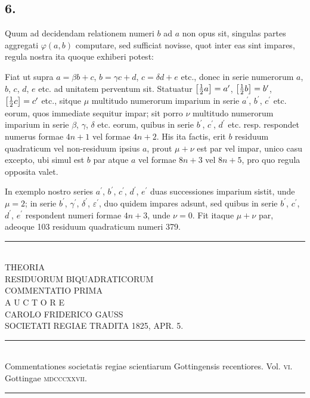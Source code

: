 \documentclass[twoside,12pt]{memoir}
\let\oldfrac\frac
\def\frac#1#2{\mathchoice{\tfrac{#1}{#2}}{\oldfrac{#1}{#2}}{\genfrac{}{}{}{2}{#1}{#2\mathstrut}}{\genfrac{}{}{}{3}{#1}{#2\mathstrut}}}
\begin{document}
\subsection*{6.}
 
Quum ad decidendam relationem numeri \(b\) ad \(a\) non opus sit, singulas partes aggregati \(\varphi(a, b)\) computare, sed sufficiat novisse, quot inter eas sint impares, regula nostra ita quoque exhiberi potest:
 
Fiat ut supra \(a=\beta b+c\), \(b=\gamma c+d\), \(c=\delta d+e\) etc., donec in serie numerorum \(a\), \(b\), \(c\), \(d\), \(e\) etc. ad unitatem perventum sit. Statuatur \(\left[\frac{1}{2} a\right]=a^{\prime}\), \(\left[\frac{1}{2} b\right]=b^{\prime}\), \(\left[\frac{1}{2} c\right]=c^{\prime}\) etc., sitque \(\mu\) multitudo numerorum imparium in serie \(a^{\prime}\), \(b^{\prime}\), \(c^{\prime}\) etc. eorum, quos immediate sequitur impar; sit porro \(\nu\) multitudo numerorum imparium in serie \(\beta\), \(\gamma\), \(\delta\) etc. eorum, quibus in serie \(b^{\prime}\), \(c^{\prime}\), \(d^{\prime}\) etc. resp. respondet numerus formae \(4 n+1\) vel formae \(4 n+2\). His ita factis, erit \(b\) residuum quadraticum vel non-residuum ipsius \(a\), prout \(\mu+\nu\) est par vel impar, unico casu excepto, ubi simul est \(b\) par atque \(a\) vel formae \(8 n+3\) vel \(8 n+5\), pro quo regula opposita valet.
 
In exemplo nostro series \(a^{\prime}\), \(b^{\prime}\), \(c^{\prime}\), \(d^{\prime}\), \(e^{\prime}\) duas successiones imparium sistit, unde \(\mu=2\); in serie \(b^{\prime}\), \(\gamma^{\prime}\), \(\delta^{\prime}\), \(\varepsilon^{\prime}\), duo quidem impares adsunt, sed quibus in serie \(b^{\prime}\), \(c^{\prime}\), \(d^{\prime}\), \(e^{\prime}\) respondent numeri formae \(4 n+3\), unde \(\nu=0\). Fit itaque \(\mu+\nu\) par, adeoque 103 residuum quadraticum numeri 379.\\[1.5\baselineskip]
\begin{center}\rule{1.5in}{0.5pt}\end{center}
\pagebreak%

\begin{center}
\;\\[4\baselineskip]
{\large THEORIA  }\\[\baselineskip]
{\LARGE RESIDUORUM BIQUADRATICORUM }\\[3\baselineskip]
{\large COMMENTATIO PRIMA}\\[2.5\baselineskip]
{\tiny A U C T O R E}\\[1.5\baselineskip]
CAROLO FRIDERICO GAUSS\\[1.5\baselineskip]
{\scriptsize SOCIETATI REGIAE TRADITA {\tiny \textsc{1825},} APR. {\tiny \textsc{5}.}}\\[4\baselineskip]
\rule{4in}{0.5pt}\\[0.5\baselineskip]
{\small Commentationes societatis regiae scientiarum Gottingensis recentiores. Vol. \textsc{vi}.\\
Gottingae \textsc{mdcccxxvii}.}\\
\rule{4in}{0.5pt}
\end{center}
\pagebreak%
\;\pagebreak%
\end{document}

